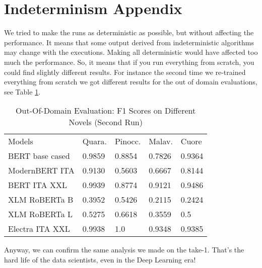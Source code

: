 \documentclass[11pt]{article}
\begin{document}
\section{Indeterminism Appendix}
\label{sec:appendix3}
We tried to make the runs as deterministic as possible, but without affecting the
performance. \newline It means that some output derived from indeterministic algorithms may change with the executions. \newline Making all deterministic would have affected too much the performance. \newline So, it means that if you run everything from scratch, you could find slightly different results. \newline For instance the second time we re-trained everything from scratch we got different results for the out of domain evaluations, see Table \ref{t4}.
\begin{table}[]
	\small
	\caption{Out-Of-Domain Evaluation: F1 Scores on Different Novels (Second Run)}
	\begin{tabular}{lllll}
		Models & Quara. & Pinocc. & Malav. & Cuore \\
		BERT base cased & 0.9859      & 0.8854 & 0.7826        & 0.9364                 \\
		ModernBERT ITA  & 0.9130     & 0.5603   & 0.6667   & 0.8144                 \\
		BERT ITA XXL  & 0.9939     & 0.8774  & 0.9121     & 0.9486                 \\
		XLM RoBERTa B & 0.3952      & 0.5426   & 0.2115     & 0.2424                 \\
		XLM RoBERTa L & 0.5275       & 0.6618    & 0.3559   & 0.5               \\
		Electra ITA XXL  & 0.9938      & 1.0   & 0.9348    & 0.9385            
	\end{tabular}
	\label{t4}
\end{table}

Anyway, we can confirm the same analysis we made on the take-1.
That's the hard life of the data scientists, even in the Deep Learning era!


\end{document}
